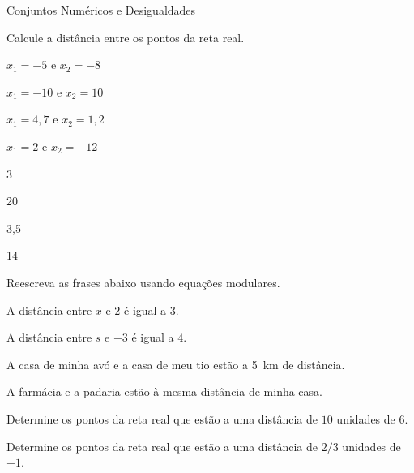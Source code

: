 \begin{exercicios}{Conjuntos Numéricos e Desigualdades}
    \begin{exercicio} %
        Calcule a distância entre os pontos da reta real.
        \begin{alphalist}
            \item \(x_1 = -5\) e \(x_2 = -8\)
            \item \(x_1 = -10\) e \(x_2 = 10\)
            \item \(x_1 = 4,7\) e \(x_2 = 1,2\)
            \item \(x_1 = 2\) e \(x_2 = -12\)
        \end{alphalist}
        \begin{answers}
            \begin{mathlist}[4]
                \item 3
                \item 20
                \item 3,5
                \item 14
            \end{mathlist}
        \end{answers}   
    \end{exercicio}
        
    \begin{exercicio}
        Reescreva as frases abaixo usando equações modulares.
        \begin{alphalist}
            \item A distância entre $x$ e $ 2$ é igual a $3$.
            \item A distância entre $s$ e $-3$ é igual a $4$.
            \item A casa de minha avó e a casa de meu tio estão a \SI{5}{\kilo\meter} de distância.
            \item A farmácia e a padaria estão à mesma distância de minha casa.
        \end{alphalist}
    \end{exercicio}

    \begin{exercicio}
        Determine os pontos da reta real que estão a uma distância de $10$ unidades de $6$.
    \end{exercicio}

    \begin{exercicio}
        Determine os pontos da reta real que estão a uma distância de $2/3$ unidades de $-1$.
    \end{exercicio}


\end{exercicios}

